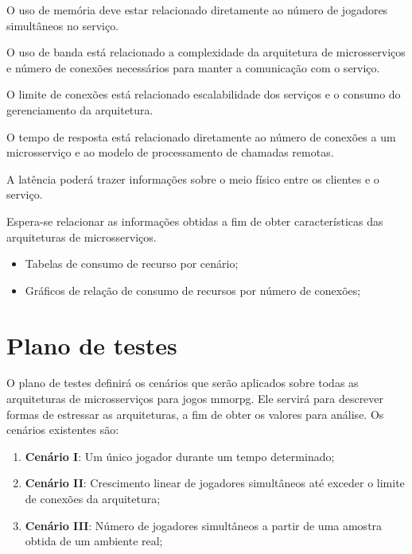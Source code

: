 O uso de memória deve estar relacionado diretamente ao número de jogadores simultâneos no serviço.

O uso de banda está relacionado a complexidade da arquitetura de microsserviços e número de conexões necessários para manter a comunicação com o serviço.

O limite de conexões está relacionado escalabilidade dos serviços e o consumo do gerenciamento da arquitetura.

O tempo de resposta está relacionado diretamente ao número de conexões a um microsserviço e ao modelo de processamento de chamadas remotas.

A latência poderá trazer informações sobre o meio físico entre os clientes e o serviço.

Espera-se relacionar as informações obtidas a fim de obter características das arquiteturas de microsserviços.

\begin{itemize}
  \item Tabelas de consumo de recurso por cenário;
  \item Gráficos de relação de consumo de recursos por número de conexões;
\end{itemize}






\section {Plano de testes}
\label{sec:plano}

O plano de testes definirá os cenários que serão aplicados sobre todas as arquiteturas de microsserviços para jogos \ac{mmorpg}.
%
Ele servirá para descrever formas de estressar as arquiteturas, a fim de obter os valores para análise.
%
Os cenários existentes são:



\begin{enumerate}
  \item \textbf{Cenário I}: Um único jogador durante um tempo determinado;
  \item \textbf{Cenário II}: Crescimento linear de jogadores simultâneos até exceder o limite de conexões da arquitetura;
  \item \textbf{Cenário III}: Número de jogadores simultâneos a partir de uma amostra obtida de um ambiente real;
\end{enumerate}



